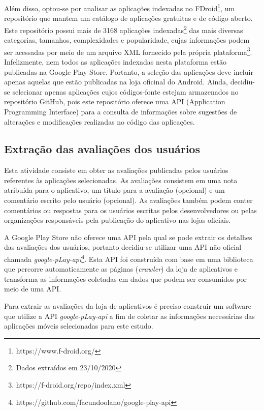 Além disso, optou-se por analisar as aplicações indexadas no FDroid\footnote{https://www.f-droid.org/}, um repositório que mantem um catálogo de aplicações gratuitas e de código aberto. Este repositório possui mais de 3168 aplicações indexadas\footnote{Dados extraídos em 23/10/2020} das mais diversas categorias, tamanhos, complexidades e popularidade, cujas informações podem ser acessadas por meio de um arquivo XML fornecido pela própria plataforma\footnote{https://f-droid.org/repo/index.xml}. 
Infelizmente, nem todos as aplicações indexadas nesta plataforma estão publicadas na Google Play Store. Portanto, a seleção das aplicações deve incluir apenas aquelas que estão publicadas na loja oficinal do Android. Ainda, decidiu-se selecionar apenas aplicações cujos códigos-fonte estejam armazenados no repositório GitHub, pois este repositório oferece uma API (Application Programming Interface) para a consulta de informações sobre sugestões de alterações e modificações realizadas no código das aplicações.


\subsection{Extração das avaliações dos usuários}
\label{sec:extracaoavaliacoes}

Esta atividade consiste em obter as avaliações publicadas pelos usuários referentes às aplicações selecionadas. As avaliações consistem em uma nota atribuída para o aplicativo, um título para a avaliação (opcional) e um comentário escrito pelo usuário (opcional). As avaliações também podem conter comentários ou respostas para os usuários escritas pelos desenvolvedores ou pelas organizações responsáveis pela publicação do aplicativo nas lojas oficiais. 

A Google Play Store não oferece uma API pela qual se pode extrair os detalhes das avaliações dos usuários, portanto decidiu-se utilizar uma API não oficial chamada \textit{google-pLay-api}\footnote{https://github.com/facundoolano/google-play-api}. Esta API foi construída com base em uma biblioteca que percorre automaticamente as páginas (\textit{crawler}) da loja de aplicativos e transforma as informações coletadas em dados que podem ser consumidos por meio de uma API.

Para extrair as avaliações da loja de aplicativos é preciso construir um software que utilize a API  \textit{google-pLay-api} a fim de coletar as informações necessárias das aplicações móveis selecionadas para este estudo. 

